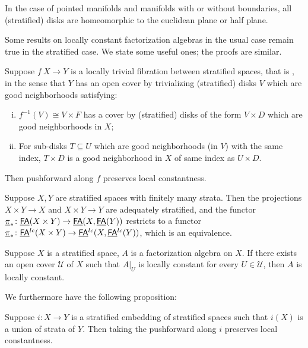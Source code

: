 \documentclass[twoside]{article}
\begin{document}
\begin{remark}
    In the case of pointed manifolds and manifolds with or without boundaries,
    all (stratified) disks are homeomorphic to the euclidean plane or half plane.
\end{remark}

Some results on locally constant factorization algebras in the usual case
remain true in the stratified case. We state some useful ones; the proofs
are similar.

\begin{proposition}
    Suppose $f\:X\to Y$ is a locally trivial fibration between stratified spaces,
    that is , in the sense that $Y$ has an open cover by
    trivializing (stratified) disks $V$ which are good neighborhoods satisfying:
    \begin{enumerate}[i)]
        \item $f^{-1}(V)\cong V\times F$ has a cover by (stratified) disks of the form
        $V\times D$ which are good neighborhoods in $X$;
        \item For sub-disks $T\subseteq U$ which are good neighborhoods (in $V$) with
        the same index, $T\times D$ is a good neighborhood in $X$ of same index as
        $U\times D$.
    \end{enumerate}
    Then pushforward along $f$ preserves local constantness.
\end{proposition}

\begin{proposition}
    Suppose $X,Y$ are stratified spaces with finitely many strata. Then the 
    projections $X\times Y\to X$ and $X\times Y\to Y$ are adequately stratified,
    and the functor $\underline\pi_*\colon\underline{\smash{\mathsf{FA}}}(X\times Y)\to\underline{\smash{\mathsf{FA}}}(X,\underline{\smash{\mathsf{FA}}}(Y))$ restricts to
    a functor $\underline\pi_*\colon\underline{\smash{\mathsf{FA}}}^{lc}(X\times Y)\to\underline{\smash{\mathsf{FA}}}^{lc}(X,\underline{\smash{\mathsf{FA}}}^{lc}(Y))$,
    which is an equivalence.
\end{proposition}

\begin{proposition}\label{m}
    Suppose $X$ is a stratified space, $A$ is a factorization algebra on $X$.
    If there exists an open cover $\mathscr U$ of $X$ such that $A|_U$ is
    locally constant for every $U\in\mathscr U$, then $A$ is locally constant.
\end{proposition}

We furthermore have the following proposition:

\begin{proposition}
    Suppose $i:X\to Y$ is a stratified embedding of stratified spaces such
    that $i(X)$ is a union of strata of $Y$. Then taking the pushforward along $i$ preserves
    local constantness.
\end{proposition}
\end{document}

